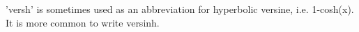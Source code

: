 'versh' is sometimes used as an abbreviation for hyperbolic versine,
i.e. 1-cosh(x). It is more common to write versinh.